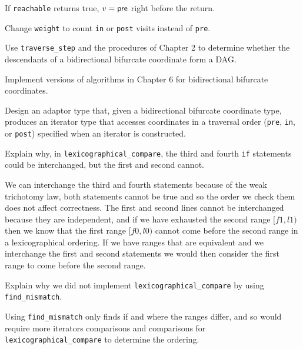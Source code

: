 \begin{lemma}
	If \verb|reachable| returns true, $v = \mathsf{pre}$ right before the return.
\end{lemma}

\begin{exercise}
	Change \verb|weight| to count \verb|in| or \verb|post| visits instead of \verb|pre|.
\end{exercise}



\begin{exercise}
	Use \verb|traverse_step| and the procedures of Chapter 2 to determine whether the
	descendants of a bidirectional bifurcate coordinate form a DAG.
\end{exercise}



\begin{project}
	Implement versions of algorithms in Chapter 6 for bidirectional bifurcate coordinates.
\end{project}

\begin{project}
	Design an adaptor type that, given a bidirectional bifurcate coordinate type, produces an iterator type
	that accesses coordinates in a traversal order (\verb|pre|, \verb|in|, or \verb|post|) specified when an
	iterator is constructed.
\end{project}

\begin{exercise}
	Explain why, in \verb|lexicographical_compare|, the third and fourth \verb|if| statements could be
	interchanged, but the first and second cannot.
\end{exercise}

\begin{solution}
	We can interchange the third and fourth statements because of the weak trichotomy law, both statements
	cannot be true and so the order we check them does not affect correctness. The first and second lines
	cannot be interchanged because they are independent, and if we have exhausted the second range $[f1, l1)$
	then we know that the first range $[f0, l0)$ cannot come before the second range in a lexicographical
	ordering. If we have ranges that are equivalent and we interchange the first and second statements we would
	then consider the first range to come before the second range.
\end{solution}

\begin{exercise}
	Explain why we did not implement \verb|lexicographical_compare| by using \verb|find_mismatch|.
\end{exercise}

\begin{solution}
	Using \verb|find_mismatch| only finds if and where the ranges differ, and so would require more
	iterators comparisons and comparisons for \verb|lexicographical_compare| to determine the ordering.
\end{solution}
